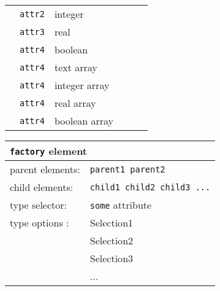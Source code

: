 \begin{table}[h]
\begin{center}
\begin{tabularx}{\textwidth}{l l l l l l }
   &   \texttt{attr2}     &  integer           &                  &                     &                       \\
   &   \texttt{attr3}     &  real              &                  &                     &                       \\
   &   \texttt{attr4}     &  boolean           &                  &                     &                       \\
   &   \texttt{attr4}     &  text array        &                  &                     &                       \\
   &   \texttt{attr4}     &  integer array     &                  &                     &                       \\
   &   \texttt{attr4}     &  real array        &                  &                     &                       \\
   &   \texttt{attr4}     &  boolean array     &                  &                     &                       \\
  \hline
\end{tabularx}
\end{center}
\end{table}




\begin{table}[h]
\begin{center}
\begin{tabularx}{\textwidth}{l l l l l l }
\hline
\multicolumn{6}{l}{\texttt{factory} element} \\
\hline
\multicolumn{2}{l}{parent elements:} & \multicolumn{4}{l}{\texttt{parent1 parent2}}\\
\multicolumn{2}{l}{child  elements:} & \multicolumn{4}{l}{\texttt{child1 child2 child3 ...}}\\
\multicolumn{2}{l}{type   selector:} & \multicolumn{4}{l}{\texttt{some} attribute}\\
\multicolumn{2}{l}{type   options :} & \multicolumn{4}{l}{Selection1}\\
\multicolumn{2}{l}{                } & \multicolumn{4}{l}{Selection2}\\
\multicolumn{2}{l}{                } & \multicolumn{4}{l}{Selection3}\\
\multicolumn{2}{l}{                } & \multicolumn{4}{l}{...}\\
  \hline
\end{tabularx}
\end{center}
\end{table}




